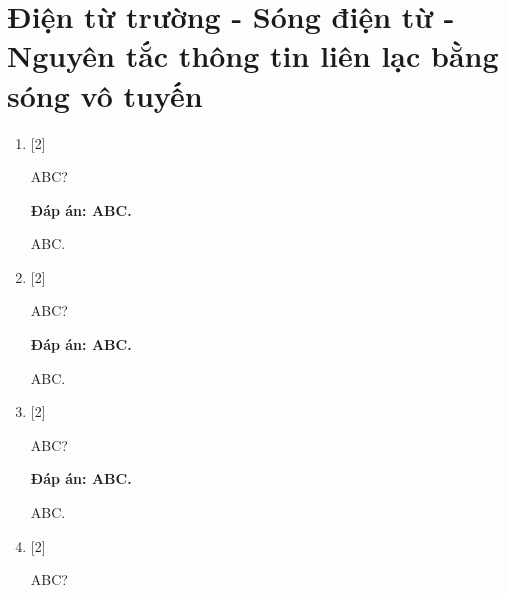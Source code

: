 \section{Điện từ trường - Sóng điện từ - Nguyên tắc thông tin liên lạc bằng sóng vô tuyến}
\begin{enumerate}[label=\bfseries Câu \arabic*:]
	\item {} [2]
	
	\cauhoi
	{ABC?
	}
	
	\loigiai
	{		\textbf{Đáp án: ABC.}
		
		ABC.
		
	}
	
	\item {} [2]
	
	\cauhoi
	{ABC?
	}
	
	\loigiai
	{		\textbf{Đáp án: ABC.}
		
		ABC.
		
	}
	
	\item {} [2]
	
	\cauhoi
	{ABC?
	}
	
	\loigiai
	{		\textbf{Đáp án: ABC.}
		
		ABC.
		
	}
	
	\item {} [2]
	
	\cauhoi
	{ABC?
	}
	

\end{enumerate}
